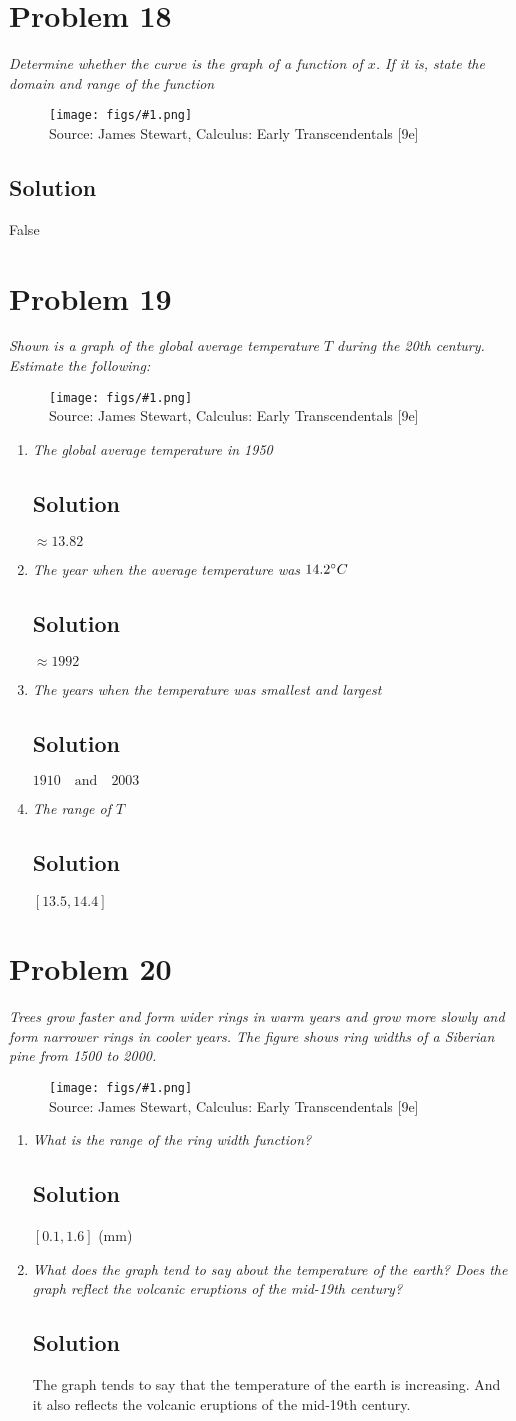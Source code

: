 \documentclass[11pt]{article}
\newcommand{\soln}{\subsection*}
\newcommand{\qn}{\textit}
\newcommand{\imagesource}[1]{{\footnotesize Source: #1}}
\newcommand{\imgqn}[1]{
	\begin{figure}[h]
		\centering
		\texttt{[image: figs/\#1.png]}\\
		\imagesource{James Stewart, Calculus: Early Transcendentals [9e]}
	\end{figure}
}
\begin{document}
\section*{Problem 18}

\qn{Determine whether the curve is the graph of a function of $x$. If it is, state the domain and range of the function}

\imgqn{1.1.18}

\soln{Solution}
False

\section*{Problem 19}

\qn{Shown is a graph of the global average temperature $T$ during the 20th century. Estimate the following:}

\imgqn{1.1.19}

\begin{enumerate}
	\item \qn{The global average temperature in 1950}
	\soln{Solution}
	$\approx 13.82$
	
	\item \qn{The year when the average temperature was $14.2 \degree C$}
	\soln{Solution}
	$\approx 1992$
	
	\item \qn{The years when the temperature was smallest and largest}
	\soln{Solution}
	$1910 \quad \text{and} \quad 2003$
	
	\item \qn{The range of $T$}
	\soln{Solution}
	$[13.5, 14.4]$
\end{enumerate}

\section*{Problem 20}

\qn{Trees grow faster and form wider rings in warm years and grow more slowly and form narrower rings in cooler years. The figure shows ring widths of a Siberian pine from 1500 to 2000.}

\imgqn{1.1.20}

\begin{enumerate}
	\item \qn{What is the range of the ring width function?}
	\soln{Solution}
	$[0.1, 1.6]$ (mm)
	
	\item \qn{What does the graph tend to say about the temperature of the earth? Does the graph reflect the volcanic eruptions of the mid-19th century?}
	\soln{Solution}
	The graph tends to say that the temperature of the earth is increasing. And it also reflects the volcanic eruptions of the mid-19th century.
\end{enumerate}
\end{document}
